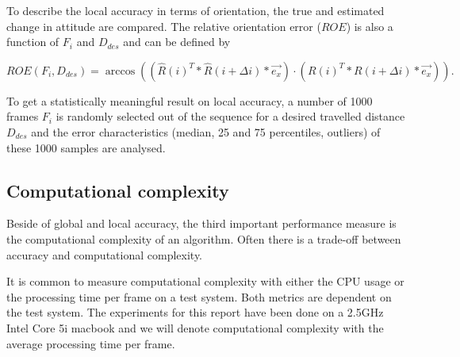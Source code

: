 To describe the local accuracy in terms of orientation, the true and estimated change in attitude are compared. The relative orientation error ($ROE$) is also a function of $F_i$ and $D_{des}$ and can be defined by

\begin{equation}
ROE\left( F_i, D_{des} \right) = \arccos \left(\left( \hat{R} \left(i\right)^T * \hat{R} \left(i+\Delta i\right) * \vec{e_{x}} \right) \cdot \left( R \left(i\right)^T * R \left(i+\Delta i\right) * \vec{e_{x}} \right)\right) .
\end{equation}

To get a statistically meaningful result on local accuracy, a number of 1000 frames $F_i$ is randomly selected out of the sequence for a desired travelled distance $D_{des}$ and the error characteristics (median, 25 and 75 percentiles, outliers) of these 1000 samples are analysed.




\subsection{Computational complexity}
\label{sec:complexity}

Beside of global and local accuracy, the third important performance measure is the computational complexity of an algorithm. Often there is a trade-off between accuracy and computational complexity.

It is common to measure computational complexity with either the CPU usage or the processing time per frame on a test system. Both metrics are dependent on the test system. The experiments for this report have been done on a 2.5GHz Intel Core 5i macbook and we will denote computational complexity with the average processing time per frame.











